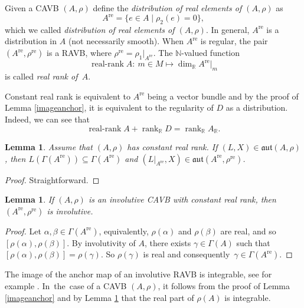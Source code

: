 \documentclass[pdftex]{sigma}
\numberwithin{equation}{section}
\newtheorem{Lemma}[Theorem]{Lemma}
\newcommand{\R}{{\mathbb{R}}}
\newcommand{\aut}{\mathfrak{aut}}
\DeclareMathOperator{\rk}{rank}
\DeclareMathOperator{\real}{re}
\begin{document}
\begin{Definition}
Given a CAVB $(A,\rho)$ define the {\em distribution of real elements of $(A,\rho)$} as
\[A^{\real} =\{e\in A\mid \rho_2(e)=0\},\]
which we called {\em distribution of real elements of $(A,\rho)$}. In general, $A^{\real}$ is a distribution in $A$ (not necessarily smooth). When $A^{\real}$ is regular, the pair $(A^{\real},\rho^{\real})$ is a RAVB, where $\rho^{\real}=\rho_1|_{A^{\real}}$. The $\mathbb{N}$-valued function %
\[\operatorname{\text{real-rank}} A\colon \ m\in M\mapsto \dim_{\R} A^{\real}|_m\]
is called {\em real rank of~$A$}.
\end{Definition}
Constant real rank is equivalent to $A^{\real}$ being a vector bundle and by the proof of Lemma \ref{imageanchor}, it is equivalent to the regularity of $D$ as a distribution. Indeed, we can see that
\begin{equation}\label{sum_identity}
  {\operatorname{\text{real-rank}} A}+\rk_{\R} D=\rk_{\R} A_{\R}.
\end{equation}
\begin{Lemma}\label{restriction_inf_aut}
   Assume that $(A,\rho)$ has constant real rank. If $(L,X)\in \aut(A,\rho)$, then $L(\Gamma(A^{\real}))\subseteq\Gamma(A^{\real})$ and $(L|_{A^{\real}}, X)\in \aut(A^{\real},\rho^{\real})$.
\end{Lemma}
\begin{proof}
  Straightforward.
\end{proof}

 \begin{Lemma}\label{cavb_inv}
 If $(A,\rho)$ is an involutive CAVB with constant real rank, then $(A^{\real}, \rho^{\real})$ is involutive.
 \end{Lemma}
\begin{proof}
Let $\alpha, \beta \in \Gamma (A^{\real})$, equivalently, $\rho (\alpha)$ and $\rho (\beta)$ are real, and so $[\rho (\alpha), \rho (\beta)]$. By involutivity of $A$, there exists $\gamma \in \Gamma (A)$ such that $[\rho (\alpha), \rho (\beta)]=\rho (\gamma)$. So $\rho (\gamma)$ is real and consequently~${\gamma\in \Gamma(A^{\real})}$.
\end{proof}


The image of the anchor map of an involutive RAVB is integrable, see for example \cite{bursztyn2019splitting}. In~the~case of a CAVB $(A,\rho)$, it follows from the proof of Lemma \ref{imageanchor} and by Lemma \ref{cavb_inv} that the real part of $\rho(A)$ is integrable.
\end{document}
